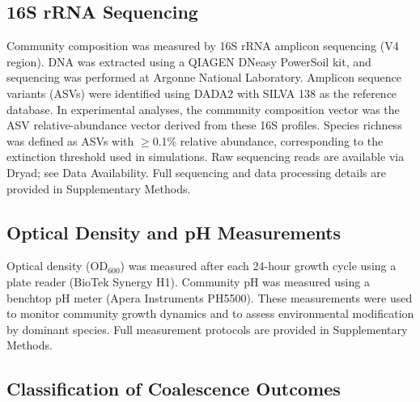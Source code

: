 \subsection*{16S rRNA Sequencing}
\label{sec:methods:sequencing}

Community composition was measured by 16S rRNA amplicon sequencing (V4 region). DNA was extracted using a QIAGEN DNeasy PowerSoil kit, and sequencing was performed at Argonne National Laboratory. Amplicon sequence variants (ASVs) were identified using DADA2\citep{Callahan2016} with SILVA 138\citep{Quast2013} as the reference database. In experimental analyses, the community composition vector was the ASV relative-abundance vector derived from these 16S profiles. Species richness was defined as ASVs with $\geq$0.1\% relative abundance, corresponding to the extinction threshold used in simulations. Raw sequencing reads are available via Dryad; see Data Availability. Full sequencing and data processing details are provided in Supplementary Methods.


\subsection*{Optical Density and pH Measurements}
\label{sec:methods:od_ph}

Optical density (OD$_{600}$) was measured after each 24-hour growth cycle using a plate reader (BioTek Synergy H1). Community pH was measured using a benchtop pH meter (Apera Instruments PH5500). These measurements were used to monitor community growth dynamics and to assess environmental modification by dominant species. Full measurement protocols are provided in Supplementary Methods.


\subsection*{Classification of Coalescence Outcomes}
\label{sec:methods:classification}

